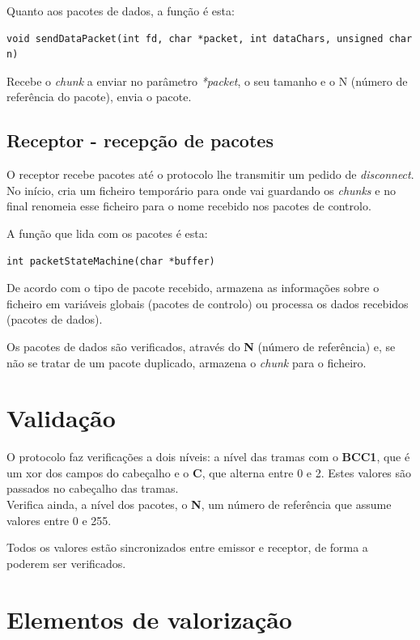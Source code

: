 \documentclass[a4paper,11pt]{article}
\begin{document}
Quanto aos pacotes de dados, a função é esta:

\begin{lstlisting}
void sendDataPacket(int fd, char *packet, int dataChars, unsigned char n)
\end{lstlisting}

Recebe o \textit{chunk} a enviar no parâmetro \textit{*packet}, o seu tamanho e o N (número de referência do pacote), envia o pacote.

\subsection{Receptor - recepção de pacotes}

O receptor recebe pacotes até o protocolo lhe transmitir um pedido de \textit{disconnect}.
No início, cria um ficheiro temporário para onde vai guardando os \textit{chunks} e no final renomeia esse ficheiro para o nome recebido nos pacotes de controlo.

A função que lida com os pacotes é esta:

\begin{lstlisting}
int packetStateMachine(char *buffer)
\end{lstlisting}

De acordo com o tipo de pacote recebido, armazena as informações sobre o ficheiro em variáveis globais (pacotes de controlo) ou processa os dados recebidos (pacotes de dados).

Os pacotes de dados são verificados, através do \textbf{N} (número de referência) e, se não se tratar de um pacote duplicado, armazena o \textit{chunk} para o ficheiro.

\section{Validação}

O protocolo faz verificações a dois níveis: a nível das tramas com o \textbf{BCC1}, que é um xor dos campos do cabeçalho e o \textbf{C}, que alterna entre 0 e 2. Estes valores são passados no cabeçalho das tramas.\\
Verifica ainda, a nível dos pacotes, o \textbf{N}, um número de referência que assume valores entre 0 e 255.

Todos os valores estão sincronizados entre emissor e receptor, de forma a poderem ser verificados.

\section{Elementos de valorização}
\end{document}
